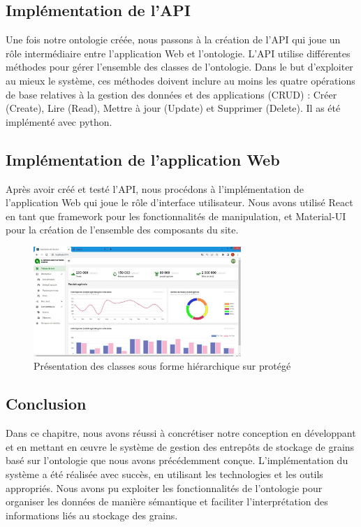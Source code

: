\documentclass{article}
\begin{document}
	\newpage

	\subsection{Implémentation de l’API}
	Une fois notre ontologie créée, nous passons à la création de l'API qui joue un rôle
	intermédiaire entre l'application Web et l'ontologie. L'API utilise différentes méthodes pour
	gérer l'ensemble des classes de l'ontologie. Dans le but d'exploiter au mieux le système, ces
	méthodes doivent inclure au moins les quatre opérations de base relatives à la gestion des
	données et des applications (CRUD) : Créer (Create), Lire (Read), Mettre à jour (Update) et
	Supprimer (Delete).
	Il as été implémenté avec python.
	
	\subsection{Implémentation de l’application Web}
	Après avoir créé et testé l'API, nous procédons à l'implémentation de l'application Web
	qui joue le rôle d'interface utilisateur. Nous avons utilisé React en tant que framework pour les
	fonctionnalités de manipulation, et Material-UI pour la création de l'ensemble des composants
	du site.
	
	\newpage
	
	\begin{figure}[h]
		\centering
		\includegraphics[width=0.7\textwidth]{tableau.png}
		\caption{Présentation des classes sous forme hiérarchique sur protégé}
		\label{fig:votre_image}
	\end{figure}

	\subsection{Conclusion}
	
		Dans ce chapitre, nous avons réussi à concrétiser notre conception en développant et en
	mettant en œuvre le système de gestion des entrepôts de stockage de grains basé sur l'ontologie
	que nous avons précédemment conçue. L'implémentation du système a été réalisée avec succès,
	en utilisant les technologies et les outils appropriés. Nous avons pu exploiter les fonctionnalités
	de l'ontologie pour organiser les données de manière sémantique et faciliter l'interprétation des
	informations liés au stockage des grains.
	
\end{document}
